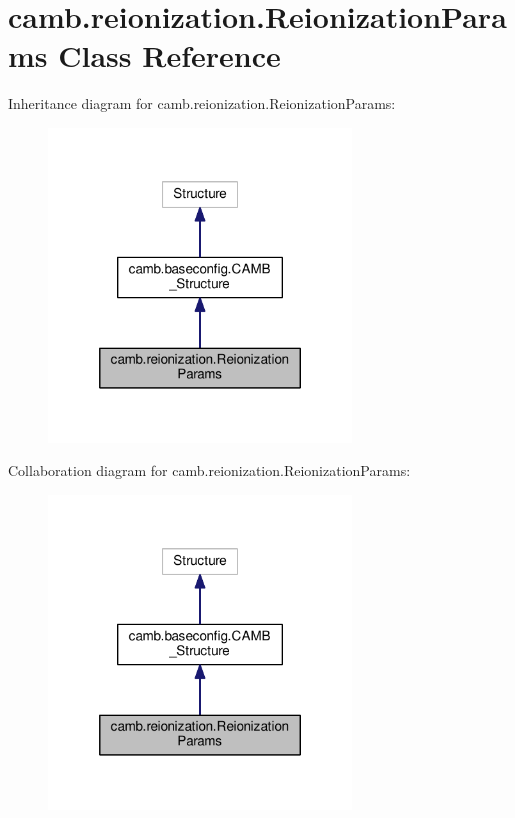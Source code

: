 \hypertarget{classcamb_1_1reionization_1_1ReionizationParams}{}\section{camb.\+reionization.\+Reionization\+Params Class Reference}
\label{classcamb_1_1reionization_1_1ReionizationParams}


Inheritance diagram for camb.\+reionization.\+Reionization\+Params\+:
\nopagebreak
\begin{figure}[H]
\begin{center}
\leavevmode
\includegraphics[width=228pt]{classcamb_1_1reionization_1_1ReionizationParams__inherit__graph}
\end{center}
\end{figure}


Collaboration diagram for camb.\+reionization.\+Reionization\+Params\+:
\nopagebreak
\begin{figure}[H]
\begin{center}
\leavevmode
\includegraphics[width=228pt]{classcamb_1_1reionization_1_1ReionizationParams__coll__graph}
\end{center}
\end{figure}
